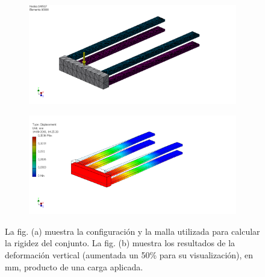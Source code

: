 \begin{figure}[H]
\centering
	\begin{subfigure}{1\linewidth}
		\centering
		\includegraphics[width=0.9\linewidth, trim={0cm 0cm 4cm 0cm},clip]{Imagenes/barra_disco2.pdf}
		\caption{}\label{fig:viga_config}
	\end{subfigure}
	\begin{subfigure}{1\linewidth}
		\centering
		\includegraphics[width=0.9\linewidth, trim={0cm 0cm 8cm 0cm},clip]{Imagenes/barradisco_fem.pdf}
		\caption{}\label{fig:viga_fem}
	\end{subfigure}%
\caption{La fig. (a) muestra la configuración y la malla utilizada para calcular la rigidez del conjunto. La fig. (b) muestra los resultados de la deformación vertical (aumentada un 50\% para su visualización), en mm, producto de una carga aplicada.}
\label{fig:viga_inventor}
\end{figure}

